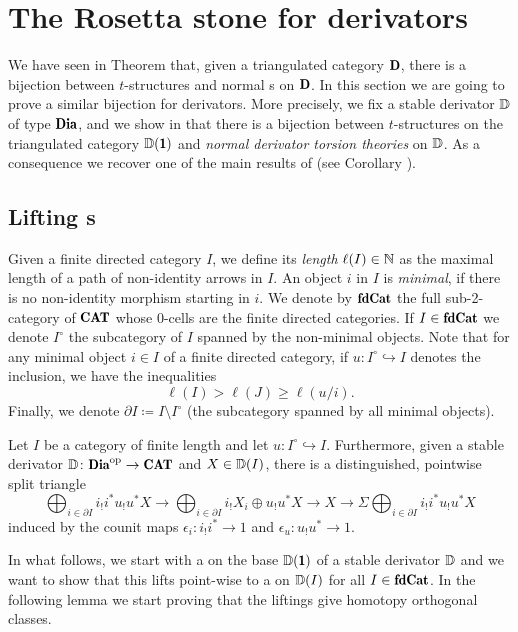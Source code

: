 \color{blue}
\section{The Rosetta stone for derivators}
We have seen in Theorem  that, given a triangulated category $\cD$, there is a bijection between $t$-structures and normal {\htth}s on $\cD$. In this section we are going to prove a similar bijection for derivators. More precisely, we fix a stable derivator $\mathbb{D}$ of type $\Dia$, and we show in \athm{} that there is a bijection between $t$-structures on the triangulated category $\D(\uno)$ and \emph{normal derivator torsion theories} on $\mathbb{D}$. As a consequence we recover one of the main results of \cite{Fiorenza2014} (see Corollary ). 
\subsection{Lifting {\hfs}s}
\begin{notat}\label{notation_rosetta}
Given a finite directed category $I$, we define its \emph{length} $\ell(I)\in \mathbb{N}$ as the maximal length of a path of non-identity arrows in $I$. An object $i$ in $I$ is \emph{minimal}, if there is no non-identity morphism starting in $i$. We denote by $\fincat$ the full sub-2-category of $\Cat$ whose $0$-cells are the finite directed categories. If $I\in\fincat$ we denote $I^\circ$ the subcategory of $I$ spanned by the non-minimal objects. Note that for any minimal object $i\in I$ of a finite directed category, if $u\colon I^\circ\hookrightarrow I$ denotes the inclusion, we have the inequalities
\[
\ell(I)>\ell(J)\geq \ell(u/i).
\] 
Finally, we denote $\partial I \coloneqq I\setminus I^\circ$ (\ie the subcategory spanned by all minimal objects).
\end{notat}
\begin{lemma}{\rm \cite{SSV}}\label{lemma_approximation_SSV}
Let $I$ be a category of finite length and let $u\colon I^\circ\hookrightarrow I$. Furthermore, given a stable derivator $\D\colon \Dia^\opp\to \Cat$ and $X\in \mathbb{D}(I)$, there is a distinguished, pointwise split triangle
\[
\bigoplus_{i\in\partial I}i_!i^*u_!u^*X\to \bigoplus_{i\in\partial I}i_!X_i\oplus u_!u^*X\to X\to \Sigma \bigoplus_{i\in\partial I}i_!i^*u_!u^*X
\]
induced by the counit maps $\epsilon_i : i_!i^*\to 1$ and $\epsilon_u : u_!u^* \to 1$.
\end{lemma}
In what follows, we start with a \hfs on the base $\D(\uno)$ of a stable derivator $\mathbb{D}$ and we want to show that this lifts point-wise to a \hfs on $\mathbb{D}(I)$ for all $I\in \fincat$. In the following lemma we start proving that the liftings give homotopy orthogonal classes.

